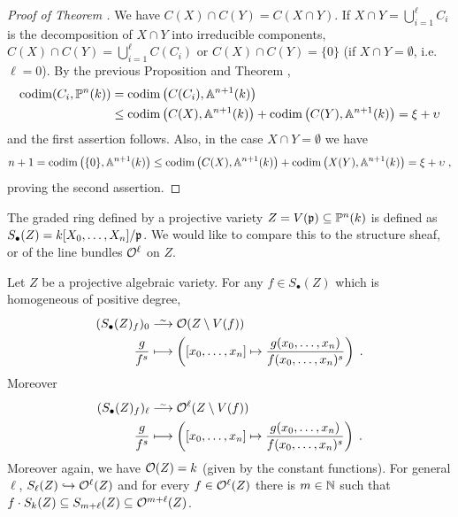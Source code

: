 \documentclass[a4paper,parskip=half,numbers=enddot, DIV=12]{scrreprt}
\begin{document}
\begin{proof}[Proof of Theorem ]
    We have $C(X)\cap C(Y) = C(X\cap Y)$. If $X\cap Y= \bigcup_{i=1}^\ell C_i$ is the decomposition of $X\cap Y$ into irreducible components, $C(X)\cap C(Y) = \bigcup_{i=1}^\ell C(C_i)$ or $C(X) \cap C(Y) = \{0\}$ (if $X\cap Y=\emptyset$, i.e. $\ell=0$). By the previous Proposition and Theorem , 
    \begin{align*}
    	 \operatorname{codim}(C_i, \mathbb{P}^n(k)) &= \operatorname{codim}\big(C(C_i), \mathbb{A}^{n+1}(k)\big)\\
    	 & \leq \operatorname{codim}\big(C(X), \mathbb{A}^{n+1}(k)\big) +\operatorname{codim}\big(C(Y), \mathbb{A}^{n+1}(k)\big)= \xi+\upsilon 
    \end{align*}
   and the first assertion follows. Also, in the case $X\cap Y =\emptyset$ we have 
   \begin{align*}
	   	n+1 = \operatorname{codim}\big(\{0\}, \mathbb{A}^{n+1}(k)\big) \leq \operatorname{codim}\big(C(X),\mathbb{A}^{n+1}(k)\big)+\operatorname{codim}\big(X(Y), \mathbb{A}^{n+1}(k)\big) = \xi +\upsilon\;, 
   \end{align*}
   proving the second assertion.
\end{proof}
\begin{defi}
    The graded ring defined by a projective variety $Z = V(\mathfrak{p}) \subseteq \mathbb{P}^n(k)$ is defined as $S_\bullet(Z) = k[X_0,\ldots, X_n]/\mathfrak{p}$. We would like to compare this to the structure sheaf, or of the line bundles $\mathcal{O}^\ell$ on $Z$. 
\end{defi}
\begin{thm}
    Let $Z$ be a projective algebraic variety. For any $f\in S_\bullet(Z)$ which is homogeneous of positive degree,
    \begin{align*}
        (S_\bullet(Z)_f)_0 &\isomorphism \Oo(Z\setminus V(f))\\
        \frac{g}{f^s} &\longmapsto \left([x_0,\ldots,x_n] \mapsto \frac{g(x_0,\ldots,x_n)}{f(x_0,\ldots, x_n)^s}\right)\;.
    \end{align*}
    Moreover
    \begin{align*}
        (S_\bullet(Z)_f)_\ell &\isomorphism \Oo^\ell(Z\setminus V(f)) \\
        \frac{g}{f^s} &\longmapsto \left([x_0,\ldots,x_n] \mapsto \frac{g(x_0,\ldots,x_n)}{f(x_0,\ldots, x_n)^s}\right)\;.
    \end{align*}
    Moreover again, we have $\mathcal{O}(Z) = k$ (given by the constant functions). For general $\ell$, $S_\ell(Z)\monomorphism \Oo^\ell(Z)$ and for every $f\in \mathcal{O}^\ell(Z)$ there is $m\in \mathbb{N}$ such that $f\cdot S_k(Z)\subseteq S_{m+\ell}(Z) \subseteq \mathcal{O}^{m+\ell} (Z)$.
\end{thm}
\end{document}
